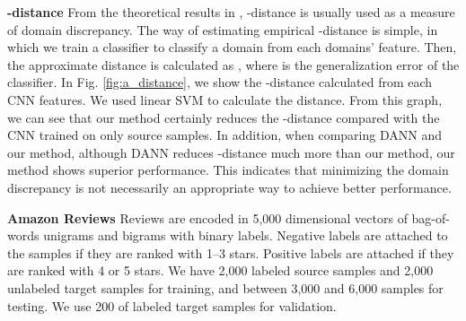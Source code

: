 \documentclass{article}
\begin{document}
\textbf{-distance}
From the theoretical results in \cite{ben2010theory}, -distance is usually used as a measure of domain discrepancy. The way of estimating empirical -distance is simple, in which we train a classifier to classify a domain from each domains' feature. Then, the approximate distance is calculated as , where  is the generalization error of the classifier. 
In Fig. \ref{fig:a_distance}, we show the -distance calculated from each CNN features. We used linear SVM to calculate the distance. From this graph, we can see that our method certainly reduces the -distance compared with the CNN trained on only source samples. In addition, when comparing DANN and our method, although DANN reduces -distance much more than our method, our method shows superior performance. This indicates that minimizing the domain discrepancy is not necessarily an appropriate way to achieve better performance.


\textbf{Amazon Reviews}
Reviews are encoded in 5,000 dimensional vectors of bag-of-words unigrams and bigrams with binary labels. Negative labels are attached to the samples if they are ranked with 1--3 stars. Positive labels are attached if they are ranked with 4 or 5 stars. We have 2,000 labeled source samples and 2,000 unlabeled target samples for training, and between 3,000 and 6,000 samples for testing. We use 200 of labeled target samples for validation.
\end{document}
